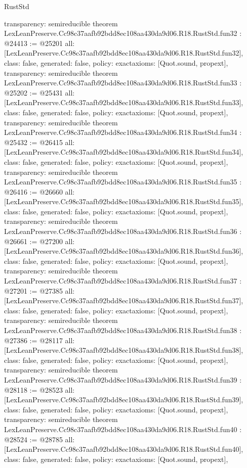 \begin{lexlean}{RustStd}
\begin{coremodule}
{  transparency: semireducible
}
theorem LexLeanPreserve.Cc98c37aafb92bdd8ec108aa430da9d06.R18.RustStd.fun32 : @24413 := @25201 {
  all: [LexLeanPreserve.Cc98c37aafb92bdd8ec108aa430da9d06.R18.RustStd.fun32],
  class: false,
  generated: false,
  policy: exact{axioms: [Quot.sound, propext]},
  transparency: semireducible
}
theorem LexLeanPreserve.Cc98c37aafb92bdd8ec108aa430da9d06.R18.RustStd.fun33 : @25202 := @25431 {
  all: [LexLeanPreserve.Cc98c37aafb92bdd8ec108aa430da9d06.R18.RustStd.fun33],
  class: false,
  generated: false,
  policy: exact{axioms: [Quot.sound, propext]},
  transparency: semireducible
}
theorem LexLeanPreserve.Cc98c37aafb92bdd8ec108aa430da9d06.R18.RustStd.fun34 : @25432 := @26415 {
  all: [LexLeanPreserve.Cc98c37aafb92bdd8ec108aa430da9d06.R18.RustStd.fun34],
  class: false,
  generated: false,
  policy: exact{axioms: [Quot.sound, propext]},
  transparency: semireducible
}
theorem LexLeanPreserve.Cc98c37aafb92bdd8ec108aa430da9d06.R18.RustStd.fun35 : @26416 := @26660 {
  all: [LexLeanPreserve.Cc98c37aafb92bdd8ec108aa430da9d06.R18.RustStd.fun35],
  class: false,
  generated: false,
  policy: exact{axioms: [Quot.sound, propext]},
  transparency: semireducible
}
theorem LexLeanPreserve.Cc98c37aafb92bdd8ec108aa430da9d06.R18.RustStd.fun36 : @26661 := @27200 {
  all: [LexLeanPreserve.Cc98c37aafb92bdd8ec108aa430da9d06.R18.RustStd.fun36],
  class: false,
  generated: false,
  policy: exact{axioms: [Quot.sound, propext]},
  transparency: semireducible
}
theorem LexLeanPreserve.Cc98c37aafb92bdd8ec108aa430da9d06.R18.RustStd.fun37 : @27201 := @27385 {
  all: [LexLeanPreserve.Cc98c37aafb92bdd8ec108aa430da9d06.R18.RustStd.fun37],
  class: false,
  generated: false,
  policy: exact{axioms: [Quot.sound, propext]},
  transparency: semireducible
}
theorem LexLeanPreserve.Cc98c37aafb92bdd8ec108aa430da9d06.R18.RustStd.fun38 : @27386 := @28117 {
  all: [LexLeanPreserve.Cc98c37aafb92bdd8ec108aa430da9d06.R18.RustStd.fun38],
  class: false,
  generated: false,
  policy: exact{axioms: [Quot.sound, propext]},
  transparency: semireducible
}
theorem LexLeanPreserve.Cc98c37aafb92bdd8ec108aa430da9d06.R18.RustStd.fun39 : @28118 := @28523 {
  all: [LexLeanPreserve.Cc98c37aafb92bdd8ec108aa430da9d06.R18.RustStd.fun39],
  class: false,
  generated: false,
  policy: exact{axioms: [Quot.sound, propext]},
  transparency: semireducible
}
theorem LexLeanPreserve.Cc98c37aafb92bdd8ec108aa430da9d06.R18.RustStd.fun40 : @28524 := @28785 {
  all: [LexLeanPreserve.Cc98c37aafb92bdd8ec108aa430da9d06.R18.RustStd.fun40],
  class: false,
  generated: false,
  policy: exact{axioms: [Quot.sound, propext]},
}
\end{coremodule}
\end{lexlean}
